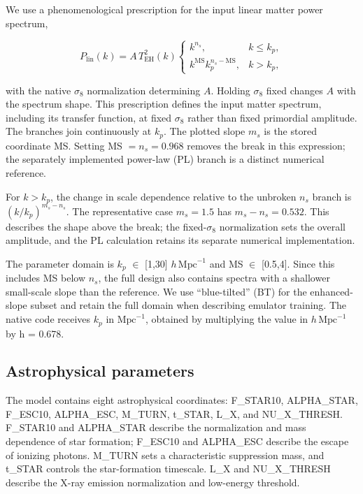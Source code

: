 We use a phenomenological prescription for the input linear matter power spectrum,

\[
P_{\mathrm{lin}}(k)=A\,T_{\mathrm{EH}}^2(k)
\begin{cases}
k^{n_s}, & k\leq k_p,\\
k^{\mathrm{MS}}k_p^{n_s-\mathrm{MS}}, & k>k_p,
\end{cases}
\]

with the native $\sigma_8$ normalization determining $A$. Holding $\sigma_8$ fixed changes $A$ with the spectrum shape. This prescription defines the input matter spectrum, including its transfer function, at fixed $\sigma_8$ rather than fixed primordial amplitude. The branches join continuously at \ensuremath{k_p}. The plotted slope $m_s$ is the stored coordinate MS. Setting MS $=n_s=0.968$ removes the break in this expression; the separately implemented power-law (PL) branch is a distinct numerical reference.

For $k>k_p$, the change in scale dependence relative to the unbroken $n_s$ branch is $(k/k_p)^{m_s-n_s}$. The representative case $m_s=1.5$ has $m_s-n_s=0.532$. This describes the shape above the break; the fixed-$\sigma_8$ normalization sets the overall amplitude, and the PL calculation retains its separate numerical implementation.

The parameter domain is \ensuremath{k_p} \(\in\) {[}1,30{]} $h\,\mathrm{Mpc}^{-1}$ and MS \(\in\) {[}0.5,4{]}. Since this includes MS below $n_s$, the full design also contains spectra with a shallower small-scale slope than the reference. We use ``blue-tilted'' (BT) for the enhanced-slope subset and retain the full domain when describing emulator training. The native code receives \ensuremath{k_p} in $\mathrm{Mpc}^{-1}$, obtained by multiplying the value in $h\,\mathrm{Mpc}^{-1}$ by h = 0.678.

\subsection{Astrophysical parameters}\label{astrophysical-parameters}

The model contains eight astrophysical coordinates: F\_STAR10, ALPHA\_STAR, F\_ESC10, ALPHA\_ESC, M\_TURN, t\_STAR, L\_X, and NU\_X\_THRESH. F\_STAR10 and ALPHA\_STAR describe the normalization and mass dependence of star formation; F\_ESC10 and ALPHA\_ESC describe the escape of ionizing photons. M\_TURN sets a characteristic suppression mass, and t\_STAR controls the star-formation timescale. L\_X and NU\_X\_THRESH describe the X-ray emission normalization and low-energy threshold.


